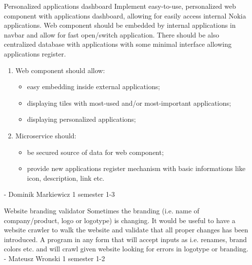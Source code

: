 \begin{project}
{Personalized applications dashboard}
{Implement easy-to-use, personalized web component with applications dashboard, allowing for easily access internal Nokia applications. Web component should be embedded by internal applications in navbar and allow for fast open/switch application. There should be also centralized database with applications with some minimal interface allowing applications register.}
{
\begin{enumerate}
	\item Web component should allow:
		\begin{itemize}
			\item easy embedding inside external applications;
			\item displaying tiles with most-used and/or most-important applications;
			\item displaying personalized applications;
		\end{itemize}
	\item Microservice should:
		\begin{itemize}
			\item be secured source of data for web component;
			\item provide new applications register mechanism with basic informations like icon, description, link etc.
		\end{itemize}
\end{enumerate}
}
{-}
{Dominik Markiewicz}
{1 semester}
{1-3}
\end{project}
\begin{project}
{Website branding validator}
{Sometimes the branding (i.e. name of company/product, logo or logotype) is changing. It would be useful to have a website crawler to walk the website and validate that all proper changes has been introduced.} 
{
A program in any form that will accept inputs as i.e. renames, brand colors etc. and will crawl given website looking for errors in logotype or branding.
}
{-}
{Mateusz Wronski}
{1 semester}
{1-2}
\end{project}
